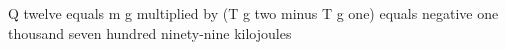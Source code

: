 Q twelve equals m g multiplied by (T g two minus T g one)  
equals negative one thousand seven hundred ninety-nine kilojoules